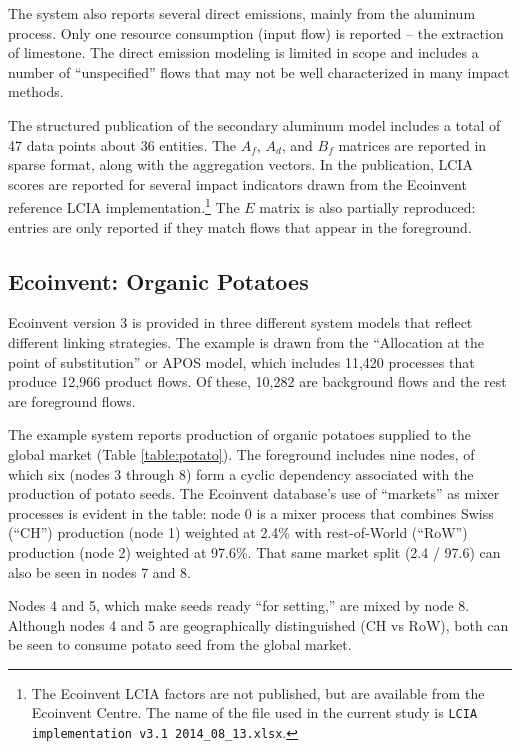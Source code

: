 The system also reports several direct emissions, mainly from the aluminum process.  Only one resource consumption (input flow) is reported -- the extraction of limestone. The direct emission modeling is limited in scope and includes a number of ``unspecified'' flows that may not be well characterized in many impact methods.

The structured publication of the secondary aluminum model includes a total of 47 data points about 36 entities.  The $A_f$, $A_d$, and $B_f$ matrices are reported in sparse format, along with the aggregation vectors. In the publication, LCIA scores are reported for several impact indicators drawn from the Ecoinvent reference LCIA implementation.\footnote{The Ecoinvent LCIA factors are not published, but are available from the Ecoinvent Centre. The name of the file used in the current study is \texttt{LCIA implementation v3.1 2014\_08\_13.xlsx}.}    The $E$ matrix is also partially reproduced: entries are only reported if they match flows that appear in the foreground.

\subsection{Ecoinvent: Organic Potatoes}



Ecoinvent version 3 is provided in three different system models that reflect different linking strategies.  The example is drawn from the ``Allocation at the point of substitution'' or APOS model, which includes 11,420 processes that produce 12,966 product flows.  Of these, 10,282 are background flows and the rest are foreground flows.

The example system reports production of organic potatoes supplied to the global market (Table \ref{table:potato}).  The foreground includes nine nodes, of which six (nodes 3 through 8) form a cyclic dependency associated with the production of potato seeds.  The Ecoinvent database's use of ``markets'' as mixer processes is evident in the table: node 0 is a mixer process that combines Swiss (``CH'') production (node 1) weighted at 2.4\%  with rest-of-World (``RoW'') production (node 2) weighted at 97.6\%.  That same market split (2.4 / 97.6) can also be seen in nodes 7 and 8.

Nodes 4 and 5, which make seeds ready ``for setting,'' are mixed by node 8. Although nodes 4 and 5 are geographically distinguished (CH vs RoW), both can be seen to consume potato seed from the global market.

